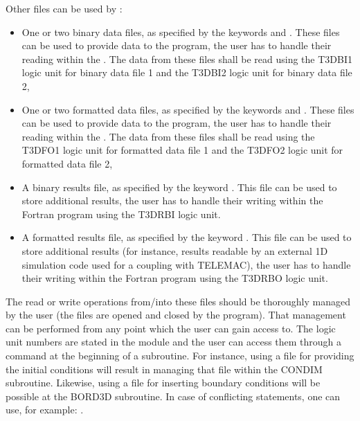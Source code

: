 Other files can be used by :

\begin{itemize}
\item One or two binary data files, as specified by the keywords
 and . These files can be
used to provide data to the program, the user has to handle their reading
within the . The data from these files shall be read using
the T3DBI1 logic unit for binary data file 1 and the T3DBI2 logic unit for
binary data file 2,

\item One or two formatted data files, as specified by the keywords
 and . These files
can be used to provide data to the program, the user has to handle their
reading within the . The data from these files shall be
read using the T3DFO1 logic unit for formatted data file 1 and the T3DFO2 logic
unit for formatted data file 2,

\item A binary results file, as specified by the keyword . This file can be used to store
additional results, the user has to handle their writing within the Fortran
program using the T3DRBI logic unit.

\item A formatted results file, as specified by the keyword . This file can be used to store additional results (for instance,
results readable by an external 1D simulation code used for a coupling with
TELEMAC), the user has to handle their writing within the Fortran program using
the T3DRBO logic unit.
\end{itemize}

The read or write operations from/into these files should be thoroughly managed
by the user (the files are opened and closed by the program). That management
can be performed from any point which the user can gain access to.  The logic
unit numbers are stated in the  module and the user can
access them through a  command at the beginning of a
subroutine. For instance, using a file for providing the initial conditions
will result in managing that file within the CONDIM subroutine. Likewise, using
a file for inserting boundary conditions will be possible at the BORD3D
subroutine. In case of conflicting statements, one can use, for example:
.

